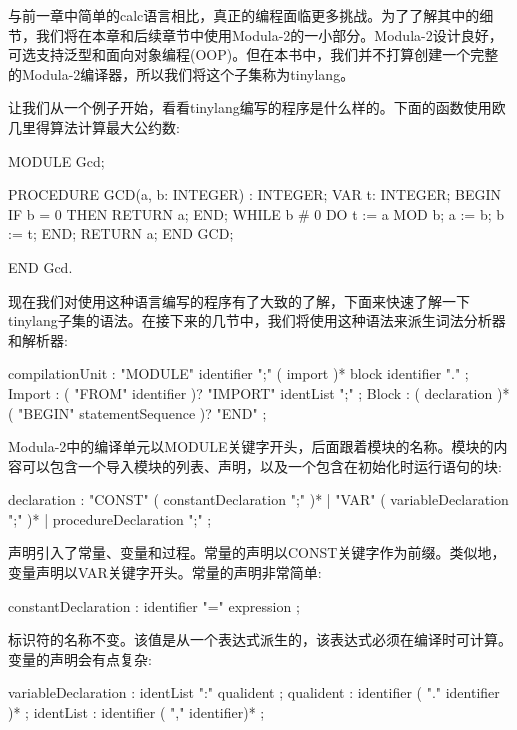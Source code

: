 与前一章中简单的calc语言相比，真正的编程面临更多挑战。为了了解其中的细节，我们将在本章和后续章节中使用Modula-2的一小部分。Modula-2设计良好，可选支持泛型和面向对象编程(OOP)。但在本书中，我们并不打算创建一个完整的Modula-2编译器，所以我们将这个子集称为tinylang。

让我们从一个例子开始，看看tinylang编写的程序是什么样的。下面的函数使用欧几里得算法计算最大公约数:

\begin{shell}
MODULE Gcd;

PROCEDURE GCD(a, b: INTEGER) : INTEGER;
VAR t: INTEGER;
BEGIN
    IF b = 0 THEN
        RETURN a;
    END;
    WHILE b # 0 DO
        t := a MOD b;
        a := b;
        b := t;
    END;
    RETURN a;
END GCD;

END Gcd.
\end{shell}

现在我们对使用这种语言编写的程序有了大致的了解，下面来快速了解一下tinylang子集的语法。在接下来的几节中，我们将使用这种语法来派生词法分析器和解析器:

\begin{shell}
compilationUnit
    : "MODULE" identifier ";" ( import )* block identifier "." ;
Import : ( "FROM" identifier )? "IMPORT" identList ";" ;
Block
    : ( declaration )* ( "BEGIN" statementSequence )? "END" ;
\end{shell}

Modula-2中的编译单元以MODULE关键字开头，后面跟着模块的名称。模块的内容可以包含一个导入模块的列表、声明，以及一个包含在初始化时运行语句的块:

\begin{shell}
declaration
    : "CONST" ( constantDeclaration ";" )*
    | "VAR" ( variableDeclaration ";" )*
    | procedureDeclaration ";" ;
\end{shell}

声明引入了常量、变量和过程。常量的声明以CONST关键字作为前缀。类似地，变量声明以VAR关键字开头。常量的声明非常简单:

\begin{shell}
constantDeclaration : identifier "=" expression ;
\end{shell}

标识符的名称不变。该值是从一个表达式派生的，该表达式必须在编译时可计算。变量的声明会有点复杂:

\begin{shell}
variableDeclaration : identList ":" qualident ;
qualident : identifier ( "." identifier )* ;
identList : identifier ( "," identifier)* ;
\end{shell}

